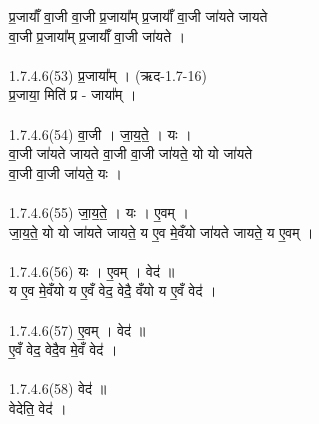प्र॒जायाँ᳚ वा॒जी वा॒जी प्र॒जाया᳚म् प्र॒जायाँ᳚ वा॒जी जा॑यते जायते\\
वा॒जी प्र॒जाया᳚म् प्र॒जायाँ᳚ वा॒जी जा॑यते ।\\
\\
1.7.4.6(53)  प्र॒जाया᳚म् । (ऋद-1.7-16)\\
प्र॒जाया॒ मिति॑ प्र - जाया᳚म् ।\\
\\
1.7.4.6(54)  वा॒जी । जा॒य॒ते॒ । यः ।\\
वा॒जी जा॑यते जायते वा॒जी वा॒जी जा॑यते॒ यो यो जा॑यते\\
वा॒जी वा॒जी जा॑यते॒ यः ।\\
\\
1.7.4.6(55)  जा॒य॒ते॒ । यः । ए॒वम् ।\\
जा॒य॒ते॒ यो यो जा॑यते जायते॒ य ए॒व मे॒वँयो जा॑यते जायते॒ य ए॒वम् ।\\
\\
1.7.4.6(56)  यः । ए॒वम् । वेद॑ ॥\\
य ए॒व मे॒वँयो य ए॒वँ वेद॒ वेदै॒ वँयो य ए॒वँ वेद॑ ।\\
\\
1.7.4.6(57)  ए॒वम् । वेद॑ ॥\\
ए॒वँ वेद॒ वेदै॒व मे॒वँ वेद॑ ।\\
\\
1.7.4.6(58)  वेद॑ ॥\\
वेदेति॒ वेद॑ ।\\\
